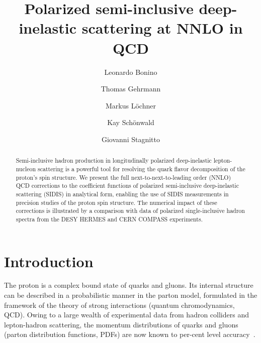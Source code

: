\documentclass[10pt,aps,prl,twocolumn,preprintnumbers,nofootinbib]{revtex4-2}
\begin{document}

\title{Polarized semi-inclusive deep-inelastic scattering at NNLO in QCD}%

\author{Leonardo Bonino}
%
\author{Thomas Gehrmann}
\author{Markus L\"ochner}
%
 \author{ Kay Sch\"onwald}
\author{Giovanni Stagnitto}
%


\begin{abstract}
  Semi-inclusive hadron production in longitudinally polarized deep-inelastic lepton-nucleon scattering is a powerful tool for resolving the quark flavor decomposition of the 
  proton's spin structure.  
We present the full next-to-next-to-leading order (NNLO) QCD corrections to the coefficient functions of polarized semi-inclusive deep-inelastic scattering (SIDIS) in analytical form, enabling the use of SIDIS measurements in precision studies of the proton spin structure. The numerical impact of these corrections is illustrated by a comparison with data of polarized single-inclusive hadron spectra from the DESY HERMES and CERN COMPASS experiments.
\end{abstract}

\maketitle

\section{Introduction}

The proton is a complex bound state of quarks and gluons. Its internal structure can be described in a 
probabilistic manner in the parton model, formulated in the framework of the theory of strong interactions (quantum chromodynamics, QCD). Owing to a large wealth of experimental data from hadron colliders and lepton-hadron scattering, the momentum distributions of quarks and gluons (parton distribution functions, PDFs) are now known to per-cent level accuracy~\cite{Gao:2017yyd,Bailey:2020ooq,Hou:2019efy,NNPDF:2021njg}. 
\end{document}
